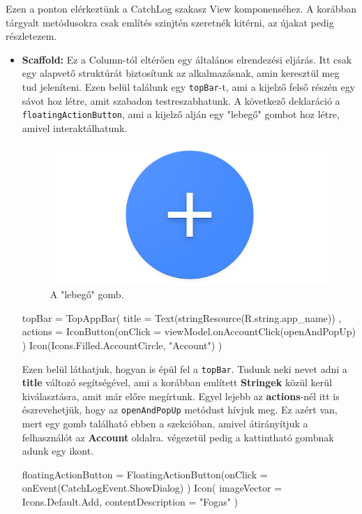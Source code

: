 Ezen a ponton elérkeztünk a CatchLog szakasz View komponenséhez. A korábban tárgyalt metódusokra csak említés szinjtén szeretnék kitérni, az újakat pedig részletezem.

\begin{itemize}
    \item \textbf{Scaffold:} Ez a Column-tól eltérően egy általános elrendezési eljárás. Itt csak egy alapvető struktúrát biztosítunk az alkalmazásnak, amin keresztül meg tud jeleníteni. Ezen belül találunk egy \texttt{topBar}-t, ami a kijelző felső részén egy sávot hoz létre, amit szabadon testreszabhatunk. A következő deklaráció a 
    \newline
    \texttt{floatingActionButton}, ami a kijelző alján egy "lebegő" gombot hoz létre, amivel interaktálhatunk.
\begin{figure} [h]
\centering
\includegraphics[width=0.5\linewidth]{images/floatingactionbutton.png}
\caption{A "lebegő" gomb.}
\label{fig:floatingactionbutton}
\end{figure}
\newpage

\begin{java} [caption = { A topBar szemléltetése.}]
topBar = {
    TopAppBar(
    title = { Text(stringResource(R.string.app_name)) },
    actions = {
        IconButton(onClick = {
            viewModel.onAccountClick(openAndPopUp) }) {
            Icon(Icons.Filled.AccountCircle,
                "Account")
            }
        }
    )
} 
\end{java}
Ezen belül láthatjuk, hogyan is épül fel a \texttt{topBar}.
Tudunk neki nevet adni a \textbf{title} változó segítségével, ami a korábban említett \textbf{Stringek} közül kerül kiválasztásra, amit már előre megírtunk.
Egyel lejebb az \textbf{actions}-nél itt is észrevehetjük, hogy az \texttt{openAndPopUp} metódust hívjuk meg. Ez azért van, mert egy gomb található ebben a szekcióban, amivel átirányítjuk a felhasználót az \textbf{Account} oldalra. végezetül pedig a kattintható gombnak adunk egy ikont.

\begin{java} [caption = {A lebegő gomb programbeli megvalósítása.}]
 floatingActionButton = {
    FloatingActionButton(onClick = {
         onEvent(CatchLogEvent.ShowDialog)
    }) {
        Icon(
            imageVector = Icons.Default.Add,
            contentDescription = "Fogas"
        )
    }
}
\end{java}


\end{itemize}
